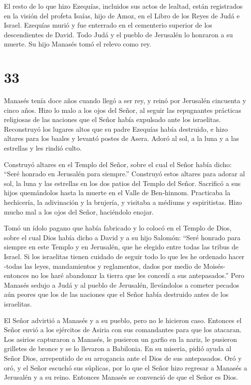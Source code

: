  El resto de lo que hizo Ezequías, incluidos sus actos de
lealtad, están registrados en la visión del profeta Isaías, hijo de
Amoz, en el Libro de los Reyes de Judá e Israel.  Ezequías
murió y fue enterrado en el cementerio superior de los descendientes de
David. Todo Judá y el pueblo de Jerusalén lo honraron a su muerte. Su
hijo Manasés tomó el relevo como rey.

\hypertarget{section-32}{%
\section{33}\label{section-32}}

 Manasés tenía doce años cuando llegó a ser rey, y reinó por
Jerusalén cincuenta y cinco años.  Hizo lo malo a los ojos
del Señor, al seguir las repugnantes prácticas religiosas de las
naciones que el Señor había expulsado ante los israelitas. 
Reconstruyó los lugares altos que su padre Ezequías había destruido, e
hizo altares para los baales y levantó postes de Asera. Adoró al sol, a
la luna y a las estrellas y les rindió culto.

 Construyó altares en el Templo del Señor, sobre el cual el
Señor había dicho: ``Seré honrado en Jerusalén para siempre.''
 Construyó estos altares para adorar al sol, la luna y las
estrellas en los dos patios del Templo del Señor.  Sacrificó
a sus hijos quemándolos hasta la muerte en el Valle de Ben-hinnom.
Practicaba la hechicería, la adivinación y la brujería, y visitaba a
médiums y espiritistas. Hizo mucho mal a los ojos del Señor, haciéndolo
enojar.

 Tomó un ídolo pagano que había fabricado y lo colocó en el
Templo de Dios, sobre el cual Dios había dicho a David y a su hijo
Salomón: ``Seré honrado para siempre en este Templo y en Jerusalén, que
he elegido entre todas las tribus de Israel.  Si los
israelitas tienen cuidado de seguir todo lo que les he ordenado hacer
-todas las leyes, mandamientos y reglamentos, dados por medio de Moisés-
entonces no los haré abandonar la tierra que les concedí a sus
antepasados.''  Pero Manasés sedujo a Judá y al pueblo de
Jerusalén, llevándolos a cometer pecados aún peores que los de las
naciones que el Señor había destruido antes de los israelitas.

 El Señor advirtió a Manasés y a su pueblo, pero no le
hicieron caso.  Entonces el Señor envió a los ejércitos de
Asiria con sus comandantes para que los atacaran. Los asirios capturaron
a Manasés, le pusieron un garfio en la nariz, le pusieron grilletes de
bronce y se lo llevaron a Babilonia.  En su miseria, pidió
ayuda al Señor Dios, arrepentido de su arrogancia ante el Dios de sus
antepasados.  Oró y oró, y el Señor escuchó sus súplicas,
por lo que el Señor hizo regresar a Manasés a Jerusalén y a su reino.
Entonces Manasés se convenció de que el Señor es Dios.

